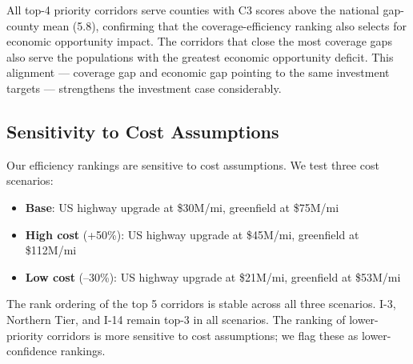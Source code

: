 All top-4 priority corridors serve counties with C3 scores above the national gap-county mean (5.8), confirming that the coverage-efficiency ranking also selects for economic opportunity impact. The corridors that close the most coverage gaps also serve the populations with the greatest economic opportunity deficit. This alignment --- coverage gap and economic gap pointing to the same investment targets --- strengthens the investment case considerably.

\subsection{Sensitivity to Cost Assumptions}

Our efficiency rankings are sensitive to cost assumptions. We test three cost scenarios:
\begin{itemize}
\item \textbf{Base}: US highway upgrade at \$30M/mi, greenfield at \$75M/mi
\item \textbf{High cost} (+50\%): US highway upgrade at \$45M/mi, greenfield at \$112M/mi
\item \textbf{Low cost} (--30\%): US highway upgrade at \$21M/mi, greenfield at \$53M/mi
\end{itemize}

The rank ordering of the top 5 corridors is stable across all three scenarios. I-3, Northern Tier, and I-14 remain top-3 in all scenarios. The ranking of lower-priority corridors is more sensitive to cost assumptions; we flag these as lower-confidence rankings.
